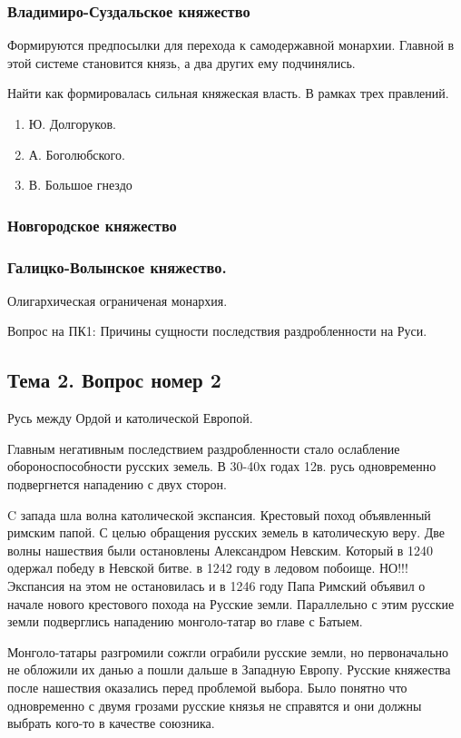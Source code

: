 \documentclass[a4paper]{article}
\begin{document}
\subsubsection{Владимиро-Суздальское княжество}
Формируются предпосылки для перехода к самодержавной монархии. Главной в этой системе становится князь, а два других ему подчинялись.

Найти как формировалась сильная княжеская власть. В рамках трех правлений.
\begin{enumerate}
\item Ю. Долгоруков. 
\item А. Боголюбского.
\item В. Большое гнездо
\end{enumerate}

\subsubsection{Новгородское княжество}
 
\subsubsection{Галицко-Волынское княжество.}
Олигархическая ограниченая монархия. 

Вопрос на ПК1: Причины сущности последствия раздробленности на Руси.

\subsection{Тема 2. Вопрос номер 2}
Русь между Ордой и католической Европой.

Главным негативным последствием раздробленности стало ослабление обороноспособности русских земель.
В 30-40х годах 12в. русь одновременно подвергнется нападению с двух сторон.

C запада шла волна католической экспансия. Крестовый поход объявленный римским папой. С целью обращения русских земель в католическую веру. Две волны нашествия были остановлены Александром Невским. Который в 1240 одержал победу в Невской битве. в 1242 году в ледовом побоище. НО!!! Экспансия на этом не остановилась и в 1246 году Папа Римский объявил о начале нового крестового похода на Русские земли. Параллельно с этим русские земли подверглись нападению монголо-татар во главе с Батыем.

Монголо-татары разгромили сожгли ограбили русские земли, но первоначально не обложили их данью а пошли дальше в Западную Европу. Русские княжества после нашествия оказались перед проблемой выбора. Было понятно что одновременно с двумя грозами русские князья не справятся и они должны выбрать кого-то в качестве союзника.
\end{document}
